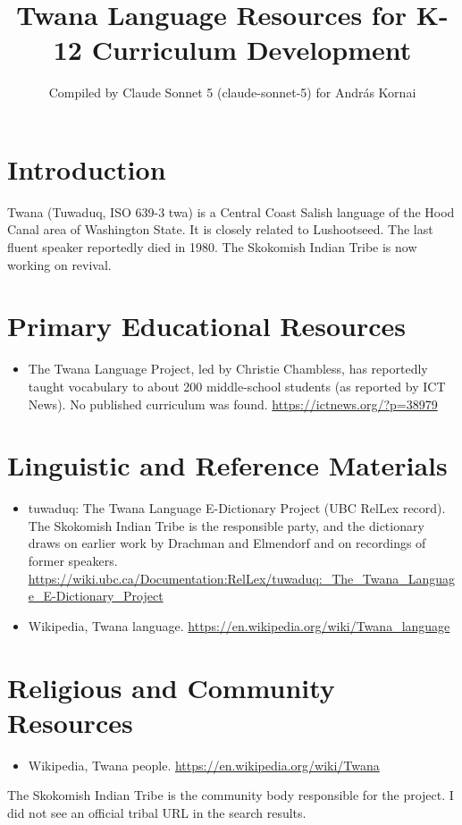 \documentclass[12pt]{article}
\title{Twana Language Resources for K-12 Curriculum Development}
\author{Compiled by Claude Sonnet 5 (claude-sonnet-5) for Andr\'as Kornai}
\date{}
\begin{document}
\maketitle

\section{Introduction}
Twana (Tuwaduq, ISO 639-3 twa) is a Central Coast Salish language of the Hood Canal area of Washington State. It is closely related to Lushootseed. The last fluent speaker reportedly died in 1980. The Skokomish Indian Tribe is now working on revival.

\section{Primary Educational Resources}
\begin{itemize}
\item The Twana Language Project, led by Christie Chambless, has reportedly taught vocabulary to about 200 middle-school students (as reported by ICT News). No published curriculum was found. \url{https://ictnews.org/?p=38979}
\end{itemize}

\section{Linguistic and Reference Materials}
\begin{itemize}
\item tuwaduq: The Twana Language E-Dictionary Project (UBC RelLex record). The Skokomish Indian Tribe is the responsible party, and the dictionary draws on earlier work by Drachman and Elmendorf and on recordings of former speakers. \url{https://wiki.ubc.ca/Documentation:RelLex/tuwaduq:_The_Twana_Language_E-Dictionary_Project}
\item Wikipedia, Twana language. \url{https://en.wikipedia.org/wiki/Twana_language}
\end{itemize}

\section{Religious and Community Resources}
\begin{itemize}
\item Wikipedia, Twana people. \url{https://en.wikipedia.org/wiki/Twana}
\end{itemize}
The Skokomish Indian Tribe is the community body responsible for the project. I did not see an official tribal URL in the search results.
\end{document}
